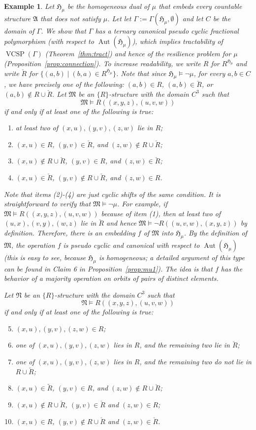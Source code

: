 \documentclass[nonacm]{acmart}
\newcommand{\bA}{{\mathfrak A}}
\newcommand{\bH}{{\mathfrak H}}
\newcommand{\bM}{{\mathfrak M}}
\newcommand{\bN}{{\mathfrak N}}
\DeclareMathOperator{\Aut}{Aut}
\DeclareMathOperator{\VCSP}{VCSP}
\newtheorem{expl}[theorem]{Example}
\begin{document}
\begin{expl}
Let $\bH_\mu$ be the homogeneous dual of $\mu$ that embeds every countable structure $\bA$ that does not satisfy $\mu$. Let let $\Gamma := \Gamma(\bH_\mu, \emptyset)$ and let $C$ be the domain of $\Gamma$.
We show that $\Gamma$ has a ternary canonical pseudo cyclic fractional polymorphism (with respect to $\Aut(\bH_\mu)$), which implies tractability of $\VCSP(\Gamma)$ (Theorem~\ref{thm:tract}) and hence of the resilience problem for $\mu$ (Proposition~\ref{prop:connection}).
To increase readability, we write
$R$ for $R^{\bH_\mu}$ and write
$\breve{R}$ for $\{(a,b) \mid (b,a) \in R^{\bH_\mu}\}$.
Note that since $\bH_\mu \models \neg \mu$, for every $a,b \in C$, we have precisely one of the following: $(a,b) \in R$, $(a,b) \in \breve{R}$, or $(a,b) \notin R \cup \breve{R}$.
Let $\bM$ be an $\{R\}$-structure with the domain $C^3$ such that 
\[\bM \models R((x,y,z), (u,v,w))\]
if and only if at least one of the following is true: 
\begin{enumerate}[(1)]
\item at least two of $(x,u), (y,v), (z,w)$ lie in $R$;
\item  $(x,u) \in R$, $(y,v) \in \breve{R}$, and $(z,w) \notin R \cup \breve{R}$;
\item 
$(x,u) \notin R \cup \breve{R}$,
$(y,v) \in R$, and $(z,w) \in \breve{R}$;
\item  $(x,u) \in \breve{R}$, $(y,v) \notin R \cup \breve{R}$, and $(z,w) \in R$.
\end{enumerate}
Note that items (2)-(4) are just cyclic shifts of the same condition.
%
It is straightforward to verify that $\bM \models \neg \mu$. For example, if $\bM \models R((x,y,z), (u,v,w))$ because of item (1), then at least two of $(u,x), (v,y), (w,z)$ lie in $\breve{R}$ and hence $\bM \models \neg R((u,v,w), (x,y,z))$ by definition. Therefore, there is an embedding $f$ of $\bM$ into $\bH_\mu$. By the definition of $\bM$, the operation $f$ is pseudo cyclic and canonical with respect to $\Aut(\bH_\mu)$
(this is easy to see, because $\bH_\mu$ is homogeneous; a detailed argument of this type can be found in Claim 6 in Proposition~\ref{prop:mu1}).
The idea is that $f$ has the behavior of a majority operation on orbits of pairs of distinct elements. 

Let $\bN$ be an $\{R\}$-structure with the domain $C^3$ such that 
\[\bN \models R((x,y,z), (u,v,w))\]
if and only if at least one of the following is true: 
\begin{enumerate}[(1)]
\setcounter{enumi}{4}
\item $(x,u), (y,v), (z,w) \in R$;
\item one of $(x,u), (y,v), (z,w)$ lies in $R$, and the remaining two lie in 
$\breve{R}$; 
\item one of $(x,u), (y,v), (z,w)$ lies in $R$, and the remaining two do not lie in $R \cup \breve{R}$; 
\item  $(x,u) \in \tilde{R}$, $(y,v) \in R$, and $(z,w) \notin R \cup \breve{R}$;
\item $(x,u) \notin R \cup \breve{R}$, $(y,v) \in \breve{R}$ and $(z,w) \in R$; 
\item  $(x,u) \in R$, $(y,v) \notin R \cup \breve{R}$ and $(z,w) \in \breve{R}$.
\end{enumerate}


\end{expl}
\end{document}
